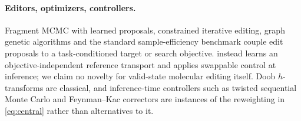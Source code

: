 \paragraph{Editors, optimizers, controllers.}
Fragment MCMC with learned proposals, constrained iterative editing, graph genetic algorithms and the standard sample-efficiency benchmark \citep{xie2021mars,fu2021mimosa,jensen2019graphga,gao2022pmo} couple edit proposals to a task-conditioned target or search objective. \method{} instead learns an objective-independent reference transport and applies swappable control at inference; we claim no novelty for valid-state molecular editing itself. Doob $h$-transforms are classical, and inference-time controllers such as twisted sequential Monte Carlo and Feynman--Kac correctors \citep{wu2023twisted,skreta2025feynman} are instances of the reweighting in \eqref{eq:central} rather than alternatives to it.
